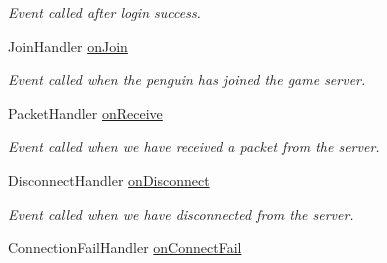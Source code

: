 \begin{DoxyCompactItemize}
\begin{DoxyCompactList}\small\item\em Event called after login success. \end{DoxyCompactList}\item 
\hypertarget{classSharpenguin_1_1PenguinBase_a671a22a751f91b472db6f427c618c131}{Join\-Handler \hyperlink{classSharpenguin_1_1PenguinBase_a671a22a751f91b472db6f427c618c131}{on\-Join}}\label{classSharpenguin_1_1PenguinBase_a671a22a751f91b472db6f427c618c131}

\begin{DoxyCompactList}\small\item\em Event called when the penguin has joined the game server. \end{DoxyCompactList}\item 
\hypertarget{classSharpenguin_1_1PenguinBase_ac2b810a66bab0069126d07ebe0ccfa42}{Packet\-Handler \hyperlink{classSharpenguin_1_1PenguinBase_ac2b810a66bab0069126d07ebe0ccfa42}{on\-Receive}}\label{classSharpenguin_1_1PenguinBase_ac2b810a66bab0069126d07ebe0ccfa42}

\begin{DoxyCompactList}\small\item\em Event called when we have received a packet from the server. \end{DoxyCompactList}\item 
\hypertarget{classSharpenguin_1_1PenguinBase_a11a9cb86a237e4aff2903c84cbc0d26f}{Disconnect\-Handler \hyperlink{classSharpenguin_1_1PenguinBase_a11a9cb86a237e4aff2903c84cbc0d26f}{on\-Disconnect}}\label{classSharpenguin_1_1PenguinBase_a11a9cb86a237e4aff2903c84cbc0d26f}

\begin{DoxyCompactList}\small\item\em Event called when we have disconnected from the server. \end{DoxyCompactList}\item 
\hypertarget{classSharpenguin_1_1PenguinBase_a1c5c62147e5a63bc6ba03c85befa6f14}{Connection\-Fail\-Handler \hyperlink{classSharpenguin_1_1PenguinBase_a1c5c62147e5a63bc6ba03c85befa6f14}{on\-Connect\-Fail}}\label{classSharpenguin_1_1PenguinBase_a1c5c62147e5a63bc6ba03c85befa6f14}


\end{DoxyCompactItemize}

